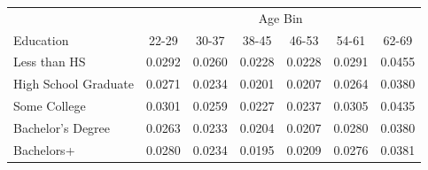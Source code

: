 \begin{tabular}{lcccccc}
\hline\hline
 & \multicolumn{6}{c}{Age Bin} \\
Education & 22-29 & 30-37 & 38-45 & 46-53 & 54-61 & 62-69 \\
\hline
Less than HS&0.0292&0.0260&0.0228&0.0228&0.0291&0.0455\\
High School Graduate&0.0271&0.0234&0.0201&0.0207&0.0264&0.0380\\
Some College&0.0301&0.0259&0.0227&0.0237&0.0305&0.0435\\
Bachelor's Degree&0.0263&0.0233&0.0204&0.0207&0.0280&0.0380\\
Bachelors+&0.0280&0.0234&0.0195&0.0209&0.0276&0.0381\\
\hline\hline
\end{tabular}
